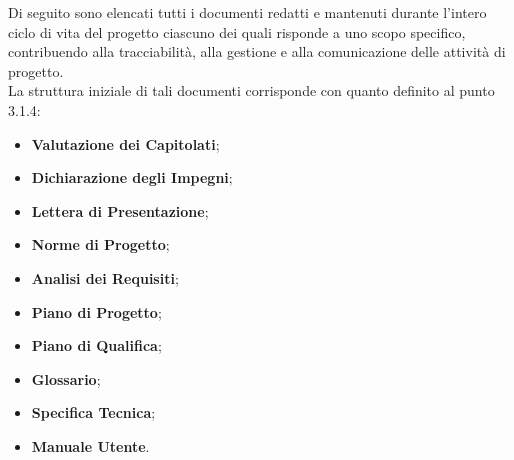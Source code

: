 \vspace{0.3em}
Di seguito sono elencati tutti i documenti redatti e mantenuti durante l'intero ciclo di vita del progetto ciascuno dei quali risponde a uno scopo specifico, contribuendo alla tracciabilità, alla gestione e alla comunicazione delle attività di progetto.\\
La struttura iniziale di tali documenti corrisponde con quanto definito al punto 3.1.4:
    \begin{itemize}[itemsep=3pt, parsep=1pt, label=$\scriptstyle\bullet$]
        \item \textbf{Valutazione dei Capitolati};
        \item \textbf{Dichiarazione degli Impegni};
        \item \textbf{Lettera di Presentazione};
        \item \textbf{Norme di Progetto};
        \item \textbf{Analisi dei Requisiti};
        \item \textbf{Piano di Progetto};
        \item \textbf{Piano di Qualifica};
        \item \textbf{Glossario};
        \item \textbf{Specifica Tecnica};
        \item \textbf{Manuale Utente}.
    \end{itemize}


